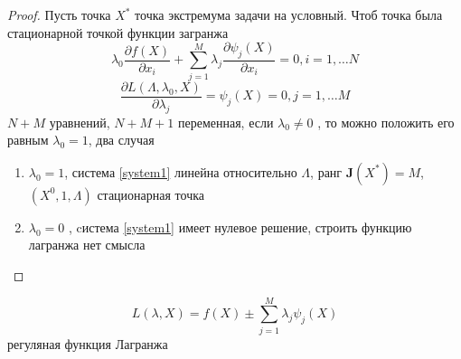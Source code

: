 \documentclass[14pt]{extarticle}
\newcommand{\pa}[2]{ \frac{\partial #1}{\partial #2}}
\begin{document}
  \begin{proof}
  	Пусть точка $X^{*}$ точка экстремума задачи
	на условный. Чтоб точка была стационарной точкой функции загранжа
	\begin{equation}
		\label{system1}
		\lambda_0 \pa{f(X)}{x_{i}} + \sum_{j=1}^{M}\lambda_{j} \pa{\psi_{j}(X)}{x_{i}} = 0 , i = 1,\dots N
	\end{equation} 
	\begin{equation}
	\pa{L(\Lambda,\lambda_0,X)}{\lambda_j} = \psi_{j}(X) = 0, j = 1,\dots M
	\end{equation} 
	$N+M$ уравнений,  $N+M+1$ переменная,
	 если $\lambda_0 \neq 0$ , то можно
	 положить его равным $\lambda_0 = 1$, 
	 два случая
	 \begin{enumerate}
		 \item $\lambda_0 = 1$, система \ref{system1} линейна
			относительно  $\Lambda$,
			 ранг  $\mathbf{J}(X^{*}) = M$,
			 $(X^{0},1,\Lambda)$ стационарная точка
		 \item $\lambda_0 = 0$ , cистема \ref{system1}
			 имеет нулевое решение, строить функцию лагранжа нет смысла
	 \end{enumerate}
  \end{proof}
  \begin{equation}
  L(\lambda,X) = f(X) \pm \sum_{j=1}^{M} \lambda_{j} \psi_{j}(X)
  \end{equation} 
  регуляная функция Лагранжа
\end{document}
